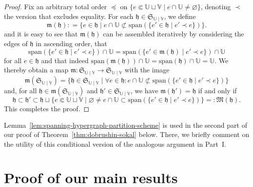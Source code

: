 \documentclass[10pt,a4paper]{amsart}
\newcommand{\V}{\mathbb V}
\newcommand{\U}{\mathbb U}
\begin{document}
\begin{proof}
	Fix an arbitrary total order $\preceq$ on $\{e \Subset \U \sqcup \V \mid e \cap \U \neq \varnothing\}$, denoting $\prec$ the version that excludes equality. 
	For each $\mathfrak h \in \mathfrak S_{\U \mid \V}$, we define
	\[
		\mathfrak m(\mathfrak h) : = \{e \in \mathfrak h \mid e \cap \U \not\subset \mathrm{span}(\{e' \in \mathfrak h \mid e' \prec e\})\}.
	\]
	and it is easy to see that $\mathfrak m(\mathfrak h)$ can be assembled iteratively by considering the edges of $\mathfrak h$ in ascending order, that
	\[
		\mathrm{span}(\{e' \in \mathfrak h \mid e' \prec e\}) \cap \U = \mathrm{span}(\{e' \in \mathfrak m(\mathfrak h) \mid e' \prec e\}) \cap \U
	\]
	for all $e \in \mathfrak h$ and that indeed $\mathrm{span}(\mathfrak m(\mathfrak h)) \cap \U = \mathrm{span}(\mathfrak h) \cap \U = \U$. 
	We thereby obtain a map $\mathfrak m : \mathfrak S_{\U \mid \V} \to \mathfrak S_{\U \mid \V}$ with the image
	\[
		\mathfrak m(\mathfrak S_{\U \mid \V}) = \{\mathfrak h \in \mathfrak S_{\U \mid \V} \mid \forall e \in \mathfrak h : e \cap \U \not\subset \mathrm{span}(\{e' \in \mathfrak h \mid e' \prec e\})\}
	\]
	and, for all $\mathfrak h \in \mathfrak m(\mathfrak S_{\U \mid \V})$ and $\mathfrak h' \in \mathfrak S_{\U \mid \V}$, we have $\mathfrak m(\mathfrak h') = \mathfrak h$ if and only if
	\[
		\mathfrak h \subset \mathfrak h' \subset \mathfrak h \sqcup \{e \Subset \U \sqcup \V \mid \varnothing \neq e \cap \U \subset \mathrm{span}(\{e' \in \mathfrak h \mid e' \prec e\})\} = : \mathfrak M(\mathfrak h).
	\]
	This completes the proof.
\end{proof}

Lemma~\ref{lem:spanning-hypergraph-partition-scheme} is used in the second part of our proof of Theorem~\ref{thm:dobrushin-sokal} below. 
There, we briefly comment on the utility of this conditional version of the analogous argument in Part~I.

\section{Proof of our main results} \label{sec:proof-main}
\end{document}
